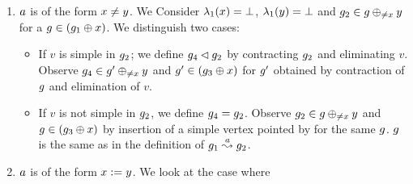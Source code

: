 \begin{enumerate}
\begin{enumerate}
\item $a$ is of the form $x\neq y$.
   We Consider 
%
    $\lambda_1(x)=\bot$, %
    $\lambda_1(y)=\bot$ and %
    $g_2\in g\oplus_{\neq{\ensuremath{x}}}{y}$ for a 
    $g\in\left(g_1\oplus{\ensuremath{x}}\right)$.
We distinguish two cases:
\begin{itemize}
\item If $v$ is simple in $g_2$; 
  we define $g_4\lhd g_2$ by contracting $g_2$ and eliminating
  $v$. Observe $g_4\in g'\oplus_{\neq{\ensuremath{x}}}{y}$ and 
  $g'\in\left(g_3\oplus{\ensuremath{x}}\right)$ for $g'$ obtained
  by contraction of $g$ and elimination of $v$.
\item If $v$ is not simple in $g_2$, 
  we define $g_4=g_2$.
  Observe $g_2\in g\oplus_{\neq{\ensuremath{x}}}{y}$ and 
  $g\in\left(g_3\oplus{\ensuremath{x}}\right)$ by insertion of a simple vertex
  pointed by \xvar for the same $g$. 
  $g$ is the same as in the definition of $g_1\stackrel{a}{\leadsto}g_2$.
\end{itemize}
\item $a$ is of the form $x:=y$.
%
We look at the case where 

\end{enumerate}
\end{enumerate}
